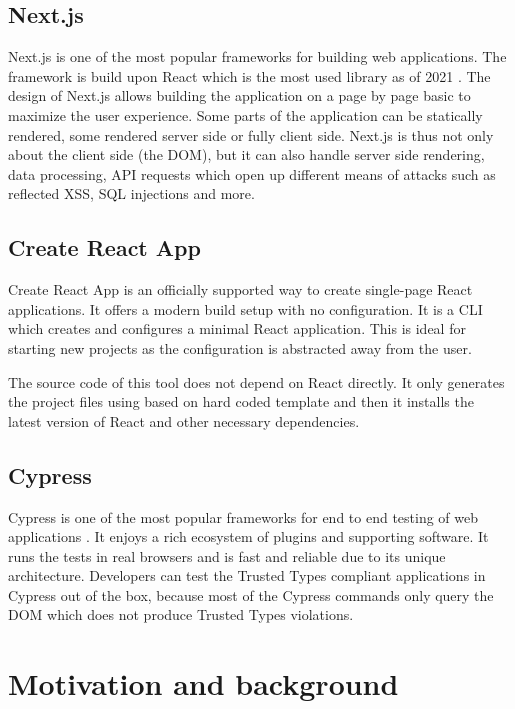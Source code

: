 \subsection{Next.js}
\label{intro-nextjs}

Next.js is one of the most popular frameworks for building web applications. The framework is build
upon React which is the most used library as of 2021 \cite{react_most_used_2021}. The design of
Next.js allows building the application on a page by page basic to maximize the user experience.
Some parts of the application can be statically rendered, some rendered server side or fully client
side. Next.js is thus not only about the client side (the DOM), but it can also handle server side
rendering, data processing, API requests which open up different means of attacks such as reflected
XSS, SQL injections and more.

\subsection{Create React App}
\label{intro-cra}

Create React App is an officially supported way to create single-page React applications. It offers
a modern build setup with no configuration. It is a CLI which creates and configures a minimal React
application. This is ideal for starting new projects as the configuration is abstracted away from
the user.

The source code of this tool does not depend on React directly. It only generates the project files
using based on hard coded template and then it installs the latest version of React and other
necessary dependencies.

\subsection{Cypress}
\label{intro:cypress}

Cypress is one of the most popular frameworks for end to end testing of web applications
\cite{js_state:testing}. It enjoys a rich ecosystem of plugins and supporting software. It runs the
tests in real browsers and is fast and reliable due to its unique architecture. Developers can test
the Trusted Types compliant applications in Cypress out of the box, because most of the Cypress
commands only query the DOM which does not produce Trusted Types violations.

\section{Motivation and background}

